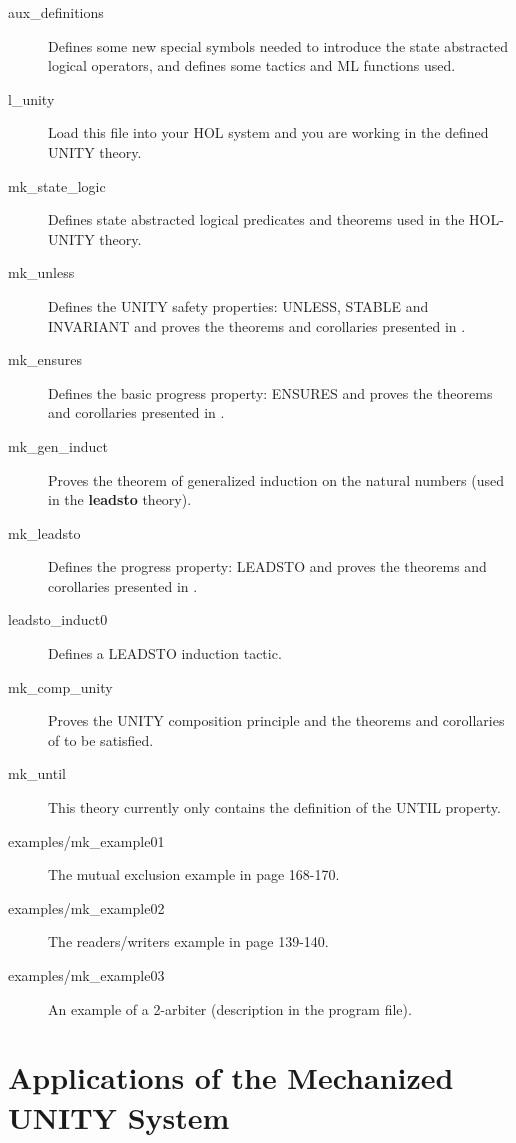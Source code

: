 \begin{description}
  \item[{\sf aux\_definitions}]
         Defines some new special symbols needed to introduce the
         state abstracted logical operators, and defines some tactics and ML
         functions used.
  \item[{\sf l\_unity}]
         Load this file into your HOL system and you are working in
         the defined UNITY theory.
  \item[{\sf mk\_state\_logic}]
         Defines state abstracted logical predicates and
         theorems used in the HOL-UNITY theory.
  \item[{\sf mk\_unless}]
         Defines the UNITY safety properties: UNLESS, STABLE and INVARIANT
         and proves the theorems and corollaries presented in \cite{CM88}.
  \item[{\sf mk\_ensures}]
         Defines the basic progress property: ENSURES and proves
         the theorems and corollaries presented in \cite{CM88}.
  \item[{\sf mk\_gen\_induct}]
         Proves the theorem of generalized induction on the
         natural numbers (used in the {\bf leadsto} theory).
  \item[{\sf mk\_leadsto}] Defines the progress property: LEADSTO
         and proves the theorems and corollaries presented in \cite{CM88}.
  \item[{\sf leadsto\_induct0}]
         Defines a LEADSTO induction tactic.
  \item[{\sf mk\_comp\_unity}]
         Proves the UNITY composition principle and the
         theorems and corollaries of \cite{CM88} to be satisfied.
  \item[{\sf mk\_until}]
         This theory currently only contains the definition of the UNTIL
         property.
  \item[{\sf examples/mk\_example01}]
         The mutual exclusion example in \cite{CM88} page 168-170.
  \item[{\sf examples/mk\_example02}]
         The readers/writers example in \cite{CM88} page 139-140.
  \item[{\sf examples/mk\_example03}]
         An example of a 2-arbiter (description in the program file).
\end{description}

\cleardoublepage
\chapter{Applications of the Mechanized UNITY System} \label{ch:unityapplic}

